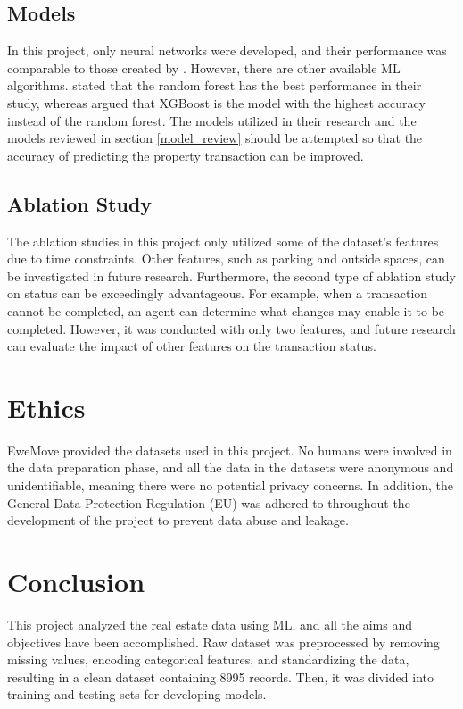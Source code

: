 \documentclass[12pt,twoside]{report}
\begin{document}
\subsection{Models}
In this project, only neural networks were developed, and their performance was comparable to those created by \citet{RN37}. However, there are other available ML algorithms. \citet{RN17} stated that the random forest has the best performance in their study, whereas \citet{RN20} argued that XGBoost is the model with the highest accuracy instead of the random forest. The models utilized in their research and the models reviewed in section \ref{model_review} should be attempted so that the accuracy of predicting the property transaction can be improved. 

\subsection{Ablation Study}
The ablation studies in this project only utilized some of the dataset's features due to time constraints. Other features, such as parking and outside spaces, can be investigated in future research. Furthermore, the second type of ablation study on status can be exceedingly advantageous. For example, when a transaction cannot be completed, an agent can determine what changes may enable it to be completed. However, it was conducted with only two features, and future research can evaluate the impact of other features on the transaction status. 

\section{Ethics}
EweMove provided the datasets used in this project. No humans were involved in the data preparation phase, and all the data in the datasets were anonymous and unidentifiable, meaning there were no potential privacy concerns. In addition, the General Data Protection Regulation (EU) was adhered to throughout the development of the project to prevent data abuse and leakage. 
\clearpage

\section{Conclusion}
This project analyzed the real estate data using ML, and all the aims and objectives have been accomplished. Raw dataset was preprocessed by removing missing values, encoding categorical features, and standardizing the data, resulting in a clean dataset containing 8995 records. Then, it was divided into training and testing sets for developing models. 
\\
\end{document}
